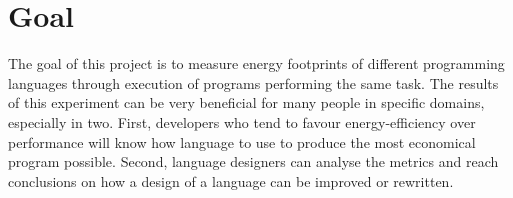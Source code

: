 \section{Goal}
\label{sec:Goal}
    The goal of this project is to measure energy footprints of different programming languages through execution of programs performing the same task. The results of this experiment can be very beneficial for many people in specific domains, especially in two. First, developers who tend to favour energy-efficiency over performance will know how language to use to produce the most economical program possible. Second, language designers can analyse the metrics and reach conclusions on how a design of a language can be improved or rewritten.